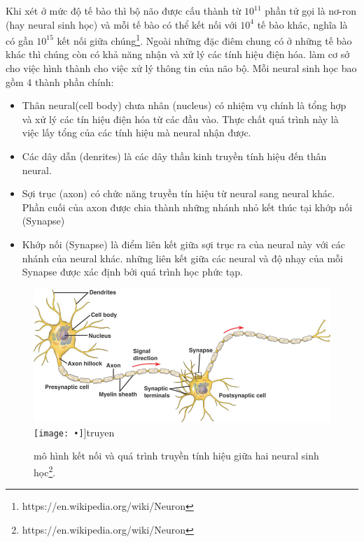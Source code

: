  	  Khi xét ở mức độ tế bào thì bộ não được cấu thành từ $10^{11}$ phần tử gọi là nơ-ron (hay neural sinh học) và mỗi tế bào có thể kết nối với $10^4$ tế bào khác, nghĩa là có gần $10^{15}$ kết nối giữa chúng\footnote{https://en.wikipedia.org/wiki/Neuron}. Ngoài những đặc điêm chung có ở những tế bào khác thì chúng còn có khả năng nhận và xử lý các tính hiệu điện hóa. làm cơ sở cho việc hình thành cho việc xử lý thông tin của não bộ. Mỗi neural sinh học bao gồm 4 thành phần chính:
 	  \begin{itemize}
 	  	\item Thân neural(cell body) chưa nhân (nucleus) có nhiệm vụ chính là tổng hợp và xử lý các tín hiệu điện hóa từ các đầu vào. Thực chất quá trình này là việc lấy tổng của các tính hiệu mà neural nhận được.
 	  	\item Các dây dẫn (denrites) là các dây thần kinh truyền tính hiệu đến thân neural.
 	  	\item Sợi trục (axon) có chức năng truyền tín hiệu từ neural sang neural khác. Phần cuối của axon được chia thành những nhánh nhỏ kết thúc tại khớp nối (Synapse)
 	  	\item Khớp nối (Synapse) là điểm liên kết giữa sợi trục ra của neural này với các nhánh của neural khác. những liên kết giữa các neural và độ nhạy của mỗi Synapse được xác định bởi quá trình học phức tạp.
 	  \end{itemize}



\begin{figure}[ht]
  \begin{center}
    \leavevmode
    \ifpdf
      \includegraphics[scale=.5]{truyen}
    \else
      \texttt{[image: •]}]{truyen}
    \fi
    \caption{mô hình kết nối và quá trình truyền tính hiệu giữa hai neural sinh học\protect\footnote{https://en.wikipedia.org/wiki/Neuron}. } 
    \label{FigAir}
  \end{center}
\end{figure}

